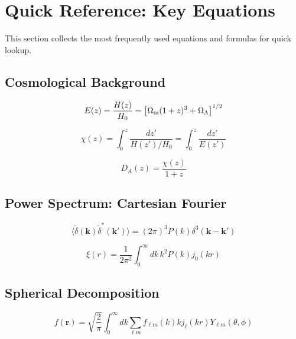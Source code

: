 \section{Quick Reference: Key Equations}\label{sec:quick_ref}

This section collects the most frequently used equations and formulas for quick lookup.

\subsection{Cosmological Background}\label{subsec:qr_background}

\begin{equation}
E(z) = \frac{H(z)}{H_0} = \left[\Omega_{\mathrm{m}} (1+z)^3 + \Omega_{\Lambda}\right]^{1/2}
\label{eq:qr_Hz}
\end{equation}

\begin{equation}
\chi(z) = \int_0^z \frac{dz'}{H(z')/H_0} = \int_0^z \frac{dz'}{E(z')}
\label{eq:qr_chi}
\end{equation}

\begin{equation}
D_A(z) = \frac{\chi(z)}{1+z}
\label{eq:qr_Da}
\end{equation}

\subsection{Power Spectrum: Cartesian Fourier}\label{subsec:qr_pk}

\begin{equation}
\langle \tilde{\delta}(\mathbf{k}) \tilde{\delta}^*(\mathbf{k}') \rangle = (2\pi)^3 P(k) \delta^3(\mathbf{k} - \mathbf{k}')
\label{eq:qr_power}
\end{equation}

\begin{equation}
\xi(r) = \frac{1}{2\pi^2} \int_0^\infty dk \, k^2 P(k) j_0(kr)
\label{eq:qr_corrfunc}
\end{equation}

\subsection{Spherical Decomposition}\label{subsec:qr_spherical}

\begin{equation}
f(\mathbf{r}) = \sqrt{\frac{2}{\pi}} \int_0^\infty dk \sum_{\ell m} f_{\ell m}(k) k j_\ell(kr) Y_{\ell m}(\theta, \phi)
\label{eq:qr_sfb_expansion}
\end{equation}

